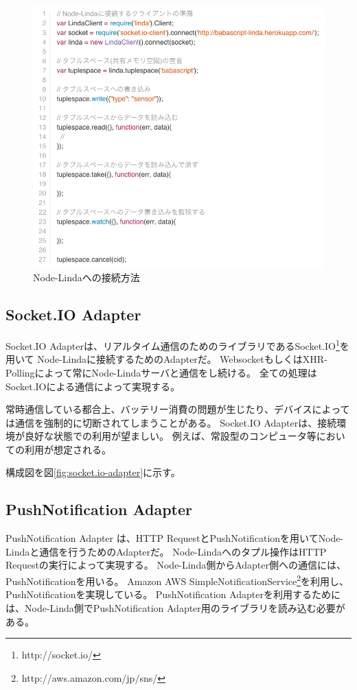 \begin{figure}[htbp]
  \begin{center}
    \includegraphics[width=.7\linewidth,bb=0 0 770 695]{images/linda-usage.js.png}
  \end{center}
  \caption{Node-Lindaへの接続方法}
  \label{fig:linda-usage}
\end{figure}

\subsection{Socket.IO Adapter}\label{socket.io-adapter}

Socket.IO
Adapterは、リアルタイム通信のためのライブラリであるSocket.IO\footnote{http://socket.io/}を用いて
Node-Lindaに接続するためのAdapterだ。
WebsocketもしくはXHR-Pollingによって常にNode-Lindaサーバと通信をし続ける。
全ての処理はSocket.IOによる通信によって実現する。

常時通信している都合上、バッテリー消費の問題が生じたり、デバイスによっては通信を強制的に切断されてしまうことがある。
Socket.IO Adapterは、接続環境が良好な状態での利用が望ましい。
例えば、常設型のコンピュータ等においての利用が想定される。

構成図を図\ref{fig:socket.io-adapter}に示す。

\subsection{PushNotification Adapter}\label{pushnotification-adapter}

PushNotification Adapter は、HTTP
RequestとPushNotificationを用いてNode-Lindaと通信を行うためのAdapterだ。
Node-Lindaへのタプル操作はHTTP Requestの実行によって実現する。
Node-Linda側からAdapter側への通信には、PushNotificationを用いる。 Amazon
AWS
SimpleNotificationService\footnote{http://aws.amazon.com/jp/sns/}を利用し、
PushNotificationを実現している。 PushNotification
Adapterを利用するためには、Node-Linda側でPushNotification
Adapter用のライブラリを読み込む必要がある。


